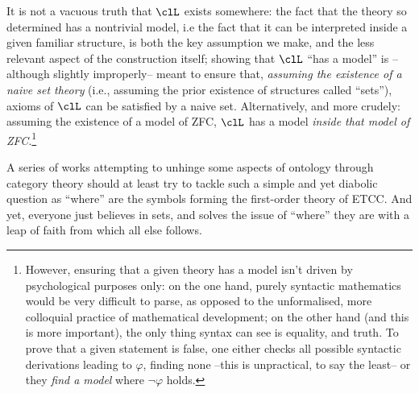 It is not a vacuous truth that $\clL$ exists somewhere: the fact that the theory so determined has a nontrivial model, i.e the fact that it can be interpreted inside a given familiar structure, is both the key assumption we make, and the less relevant aspect of the construction itself; showing that $\clL$ ``has a model'' is --although slightly improperly-- meant to ensure that, \emph{assuming the existence of a naive set theory} (i.e., assuming the prior existence of structures called ``sets''), axioms of $\clL$ can be satisfied by a naive set. Alternatively, and more crudely: assuming the existence of a model of ZFC, $\clL$ has a model \emph{inside that model of ZFC}.\footnote{However, ensuring that a given theory has a model isn't driven by psychological purposes only: on the one hand, purely syntactic mathematics would be very difficult to parse, as opposed to the unformalised, more colloquial practice of mathematical development; on the other hand (and this is more important), the only thing syntax can see is equality, and truth. To prove that a given statement is false, one either checks all possible syntactic derivations leading to $\varphi$, finding none --this is unpractical, to say the least-- or they \emph{find a model} where $\lnot\varphi$ holds.}

A series of works attempting to unhinge some aspects of ontology through category theory should at least try to tackle such a simple and yet diabolic question as ``where'' are the symbols forming the first-order theory of ETCC. And yet, everyone just believes in sets, and solves the issue of ``where'' they are with a leap of faith from which all else follows.

